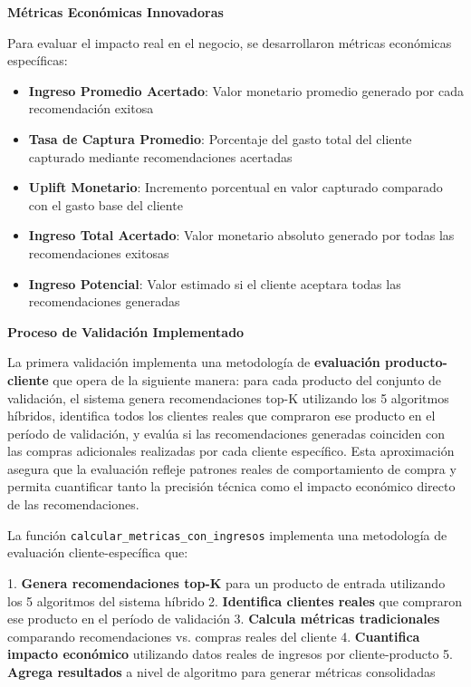 \documentclass[twocolumn]{article}
\begin{document}
\textbf{Métricas Económicas Innovadoras}

Para evaluar el impacto real en el negocio, se desarrollaron métricas económicas específicas:

\begin{itemize}
    \item \textbf{Ingreso Promedio Acertado}: Valor monetario promedio generado por cada recomendación exitosa
    \item \textbf{Tasa de Captura Promedio}: Porcentaje del gasto total del cliente capturado mediante recomendaciones acertadas
    \item \textbf{Uplift Monetario}: Incremento porcentual en valor capturado comparado con el gasto base del cliente
    \item \textbf{Ingreso Total Acertado}: Valor monetario absoluto generado por todas las recomendaciones exitosas
    \item \textbf{Ingreso Potencial}: Valor estimado si el cliente aceptara todas las recomendaciones generadas
\end{itemize}

\textbf{Proceso de Validación Implementado}

La primera validación implementa una metodología de \textbf{evaluación producto-cliente} que opera de la siguiente manera: para cada producto del conjunto de validación, el sistema genera recomendaciones top-K utilizando los 5 algoritmos híbridos, identifica todos los clientes reales que compraron ese producto en el período de validación, y evalúa si las recomendaciones generadas coinciden con las compras adicionales realizadas por cada cliente específico. Esta aproximación asegura que la evaluación refleje patrones reales de comportamiento de compra y permita cuantificar tanto la precisión técnica como el impacto económico directo de las recomendaciones.

La función \texttt{calcular\_metricas\_con\_ingresos} implementa una metodología de evaluación cliente-específica que:

1. \textbf{Genera recomendaciones top-K} para un producto de entrada utilizando los 5 algoritmos del sistema híbrido
2. \textbf{Identifica clientes reales} que compraron ese producto en el período de validación
3. \textbf{Calcula métricas tradicionales} comparando recomendaciones vs. compras reales del cliente
4. \textbf{Cuantifica impacto económico} utilizando datos reales de ingresos por cliente-producto
5. \textbf{Agrega resultados} a nivel de algoritmo para generar métricas consolidadas
\end{document}
